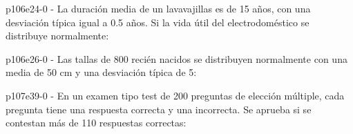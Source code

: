 \documentclass[spanish, 11pt]{exam}
\begin{document}
\begin{questions}
        \begin{multicols}{2}
        \end{multicols}
        \question p106e24-0 - La duración media de un lavavajillas es de 15 años, con una desviación típica igual a 0.5 años. Si la
vida útil del electrodoméstico se distribuye normalmente: 
    
        \begin{multicols}{1}
        \end{multicols}
        \question p106e26-0 - Las tallas de 800 recién nacidos se distribuyen normalmente con una media de 50 cm y una
desviación típica de 5: 
    
        \begin{multicols}{1}
        \end{multicols}
        \question p107e39-0 - En un examen tipo test de 200 preguntas de elección múltiple, cada pregunta tiene una
respuesta correcta y una incorrecta. Se aprueba si se contestan más de 110 respuestas correctas: 
    

\end{questions}
\end{document}
